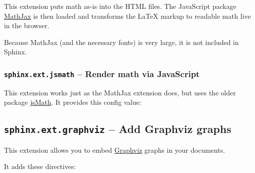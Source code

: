 \documentclass[letterpaper,10pt,english]{sphinxmanual}
\begin{document}
This extension puts math as-is into the HTML files.  The JavaScript package
\href{http://www.mathjax.org/}{MathJax} is then loaded and transforms the LaTeX markup to readable math live in
the browser.

Because MathJax (and the necessary fonts) is very large, it is not included in
Sphinx.


\subsubsection{\texttt{sphinx.ext.jsmath} -- Render math via JavaScript}
\label{ext/math:sphinx-ext-jsmath-render-math-via-javascript}\label{ext/math:module-sphinx.ext.jsmath}
This extension works just as the MathJax extension does, but uses the older
package \href{http://www.math.union.edu/~dpvc/jsmath/}{jsMath}.  It provides this config value:


\subsection{\texttt{sphinx.ext.graphviz} -- Add Graphviz graphs}
\label{ext/graphviz::doc}\label{ext/graphviz:module-sphinx.ext.graphviz}\label{ext/graphviz:amsmath-latex-package}\label{ext/graphviz:sphinx-ext-graphviz-add-graphviz-graphs}

This extension allows you to embed \href{http://graphviz.org/}{Graphviz} graphs in
your documents.

It adds these directives:
\end{document}
